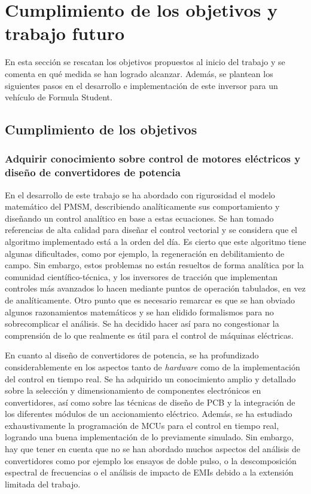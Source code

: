 \newpage
\section{Cumplimiento de los objetivos y trabajo futuro}

En esta sección se rescatan los objetivos propuestos al inicio del trabajo y se comenta en qué medida se han logrado alcanzar. Además, se plantean los siguientes pasos en el desarrollo e implementación de este inversor para un vehículo de Formula Student.

\subsection{Cumplimiento de los objetivos}

\subsubsection{Adquirir conocimiento sobre control de motores eléctricos y diseño de convertidores de potencia} 

En el desarrollo de este trabajo se ha abordado con rigurosidad el modelo matemático del PMSM, describiendo analíticamente sus comportamiento y diseñando un control analítico en base a estas ecuaciones. Se han tomado referencias de alta calidad para diseñar el control vectorial y se considera que el algoritmo implementado está a la orden del día. Es cierto que este algoritmo tiene algunas dificultades, como por ejemplo, la regeneración en debilitamiento de campo. Sin embargo, estos problemas no están resueltos de forma analítica por la comunidad científico-técnica, y los inversores de tracción que implementan controles más avanzados lo hacen mediante puntos de operación tabulados, en vez de analíticamente. Otro punto que es necesario remarcar es que se han obviado algunos razonamientos matemáticos y se han elidido formalismos para no sobrecomplicar el análisis. Se ha decidido hacer así para no congestionar la comprensión de lo que realmente es útil para el control de máquinas eléctricas.

En cuanto al diseño de convertidores de potencia, se ha profundizado considerablemente en los aspectos tanto de \textit{hardware} como de la implementación del control en tiempo real. Se ha adquirido un conocimiento amplio y detallado sobre la selección y dimensionamiento de componentes electrónicos en convertidores, así como sobre las técnicas de diseño de PCB y la integración de los diferentes módulos de un accionamiento eléctrico. Además, se ha estudiado exhaustivamente la programación de MCUs para el control en tiempo real, logrando una buena implementación de lo previamente simulado. Sin embargo, hay que tener en cuenta que no se han abordado muchos aspectos del análisis de convertidores como por ejemplo los ensayos de doble pulso, o la descomposición espectral de frecuencias o el análisis de impacto de EMIs debido a la extensión limitada del trabajo.

